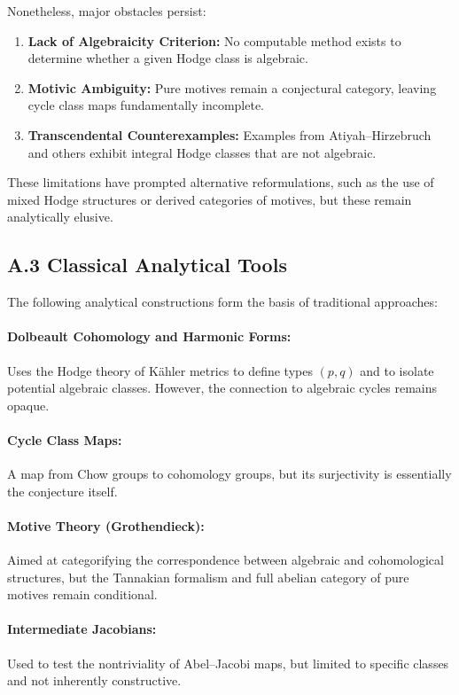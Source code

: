 \documentclass[11pt]{article}
\begin{document}
Nonetheless, major obstacles persist:

\begin{enumerate}
  \item \textbf{Lack of Algebraicity Criterion:} No computable method exists to determine whether a given Hodge class is algebraic.
  \item \textbf{Motivic Ambiguity:} Pure motives remain a conjectural category, leaving cycle class maps fundamentally incomplete.
  \item \textbf{Transcendental Counterexamples:} Examples from Atiyah–Hirzebruch and others exhibit integral Hodge classes that are not algebraic.
\end{enumerate}

These limitations have prompted alternative reformulations, such as the use of mixed Hodge structures or derived categories of motives, but these remain analytically elusive.

\subsection*{A.3 Classical Analytical Tools}

The following analytical constructions form the basis of traditional approaches:

\paragraph{Dolbeault Cohomology and Harmonic Forms:}  
Uses the Hodge theory of Kähler metrics to define types $(p,q)$ and to isolate potential algebraic classes. However, the connection to algebraic cycles remains opaque.

\paragraph{Cycle Class Maps:}  
A map from Chow groups to cohomology groups, but its surjectivity is essentially the conjecture itself.

\paragraph{Motive Theory (Grothendieck):}  
Aimed at categorifying the correspondence between algebraic and cohomological structures, but the Tannakian formalism and full abelian category of pure motives remain conditional.

\paragraph{Intermediate Jacobians:}  
Used to test the nontriviality of Abel–Jacobi maps, but limited to specific classes and not inherently constructive.
\end{document}
